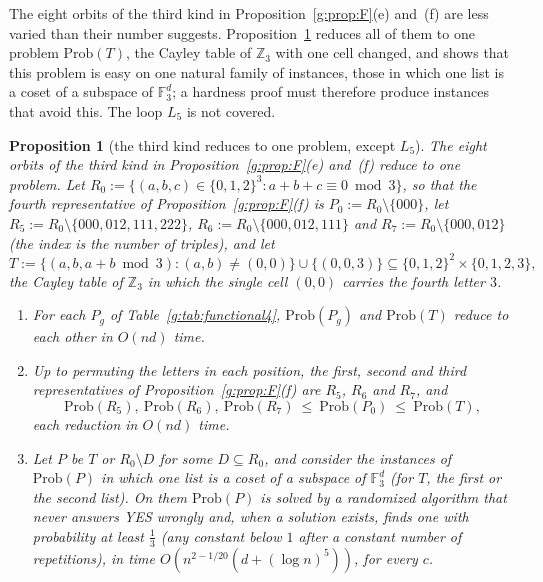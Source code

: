 \documentclass[11pt]{article}
\newtheorem{proposition}[theorem]{Proposition}
\theoremstyle{definition}
\theoremstyle{remark}
\newcommand{\Z}{\mathbb{Z}}
\newcommand{\Prob}{\mathrm{Prob}}
\begin{document}
The eight orbits of the third kind in Proposition~\ref{g:prop:F}(e) and~(f) are less varied than their number suggests. Proposition~\ref{g:prop:thirdT} reduces all of them to one problem $\Prob(T)$, the Cayley table of $\Z_3$ with one cell changed, and shows that this problem is easy on one natural family of instances, those in which one list is a coset of a subspace of $\mathbb F_3^d$; a hardness proof must therefore produce instances that avoid this. The loop $L_5$ is not covered.

\begin{proposition}[the third kind reduces to one problem, except $L_5$]\label{g:prop:thirdT}
The eight orbits of the third kind in Proposition~\ref{g:prop:F}(e) and~(f) reduce to one problem. Let $R_0:=\{(a,b,c)\in\{0,1,2\}^3:a+b+c\equiv0\bmod3\}$, so that the fourth representative of Proposition~\ref{g:prop:F}(f) is $P_0:=R_0\setminus\{000\}$, let $R_5:=R_0\setminus\{000,012,111,222\}$, $R_6:=R_0\setminus\{000,012,111\}$ and $R_7:=R_0\setminus\{000,012\}$ (the index is the number of triples), and let
\[
T:=\{(a,b,a+b\bmod3):(a,b)\ne(0,0)\}\cup\{(0,0,3)\}\subseteq\{0,1,2\}^2\times\{0,1,2,3\},
\]
the Cayley table of $\Z_3$ in which the single cell $(0,0)$ carries the fourth letter $3$.
\begin{enumerate}
\item[(1)] For each $P_g$ of Table~\ref{g:tab:functional4}, $\Prob(P_g)$ and $\Prob(T)$ reduce to each other in $O(nd)$ time.
\item[(2)] Up to permuting the letters in each position, the first, second and third representatives of Proposition~\ref{g:prop:F}(f) are $R_5$, $R_6$ and $R_7$, and
\[
\Prob(R_5),\ \Prob(R_6),\ \Prob(R_7)\ \le\ \Prob(P_0)\ \le\ \Prob(T),
\]
each reduction in $O(nd)$ time.
\item[(3)] Let $P$ be $T$ or $R_0\setminus D$ for some $D\subseteq R_0$, and consider the instances of $\Prob(P)$ in which one list is a coset of a subspace of $\mathbb F_3^d$ (for $T$, the first or the second list). On them $\Prob(P)$ is solved by a randomized algorithm that never answers YES wrongly and, when a solution exists, finds one with probability at least $\frac13$ (any constant below $1$ after a constant number of repetitions), in time $O(n^{2-1/20}(d+(\log n)^5))$, for every $c$.
\end{enumerate}
\end{proposition}
\end{document}
